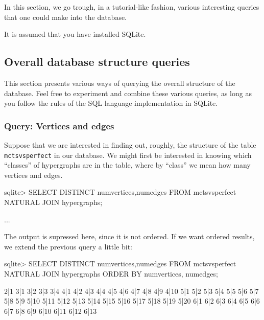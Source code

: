 In this section, we go trough, in a tutorial-like fashion, various interesting queries that one could make into the database.

It is assumed that you have installed SQLite.

\subsection{Overall database structure queries}

This section presents various ways of querying the overall structure of the database.
Feel free to experiment and combine these various queries, as long as you follow the rules of the SQL language implementation in SQLite.

\subsubsection{Query: Vertices and edges}

Suppose that we are interested in finding out, roughly, the structure of the table \texttt{mctsvsperfect} in our database.
We might first be interested in knowing which ``classes'' of hypergraphs are in the table, where by ``class'' we mean how many vertices and edges.



\begin{code}

sqlite> SELECT DISTINCT numvertices,numedges
        FROM mctsvsperfect NATURAL JOIN hypergraphs;

...

\end{code}

The output is supressed here, since it is not ordered.
If we want ordered results, we extend the previous query a little bit:


\begin{code}

sqlite> SELECT DISTINCT numvertices,numedges
        FROM mctsvsperfect NATURAL JOIN hypergraphs
        ORDER BY numvertices, numedges;

2|1
3|1
3|2
3|3
3|4
4|1
4|2
4|3
4|4
4|5
4|6
4|7
4|8
4|9
4|10
5|1
5|2
5|3
5|4
5|5
5|6
5|7
5|8
5|9
5|10
5|11
5|12
5|13
5|14
5|15
5|16
5|17
5|18
5|19
5|20
6|1
6|2
6|3
6|4
6|5
6|6
6|7
6|8
6|9
6|10
6|11
6|12
6|13

\end{code}






